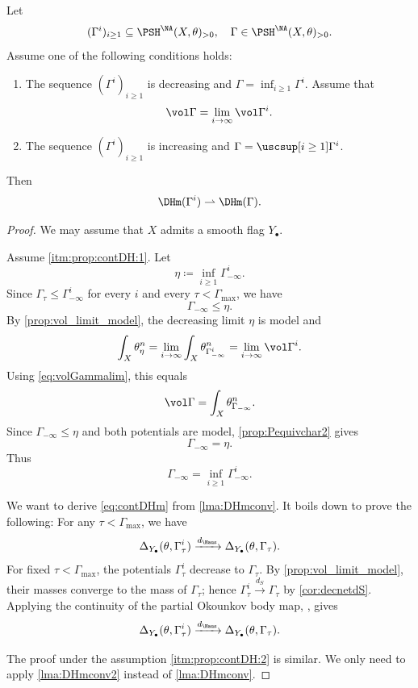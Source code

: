 \begin{proposition}\label{prop:contDH}
Let
\[
(\Gamma^i)_{i\geq 1}\subseteq \PSH^{\NA}(X,\theta)_{>0},\quad \Gamma\in \PSH^{\NA}(X,\theta)_{>0}.
\]
Assume one of the following conditions holds:
\begin{enumerate}
    \item\label{itm:prop:contDH:1} The sequence $(\Gamma^i)_{i\geq 1}$ is decreasing and $\Gamma=\inf_{i\geq 1}\Gamma^i$. Assume that
    \begin{equation}\label{eq:volGammalim}
    \vol \Gamma=\lim_{i\to\infty}\vol \Gamma^i.
    \end{equation}
    \item\label{itm:prop:contDH:2} The sequence $(\Gamma^i)_{i\geq 1}$ is increasing and $\Gamma=\uscsup[i\geq 1]\Gamma^i$.
\end{enumerate}
    Then
    \begin{equation}\label{eq:contDHm}
    \DHm(\Gamma^i)\rightharpoonup \DHm(\Gamma).
    \end{equation}
\end{proposition}
\begin{proof}
    We may assume that $X$ admits a smooth flag $Y_{\bullet}$.

    Assume \ref{itm:prop:contDH:1}. Let
\[
    \eta\coloneqq\inf_{i\geq 1}\Gamma^i_{-\infty}.
\]
Since $\Gamma_\tau\leq \Gamma^i_{-\infty}$ for every $i$ and every $\tau<\Gamma_{\max}$, we have
\[
    \Gamma_{-\infty}\leq \eta.
\]
By \cref{prop:vol_limit_model}, the decreasing limit $\eta$ is model and
\[
    \int_X\theta_\eta^n=\lim_{i\to\infty}\int_X\theta_{\Gamma^i_{-\infty}}^n=\lim_{i\to\infty}\vol\Gamma^i.
\]
Using \eqref{eq:volGammalim}, this equals
\[
    \vol\Gamma=\int_X\theta_{\Gamma_{-\infty}}^n.
\]
Since $\Gamma_{-\infty}\leq\eta$ and both potentials are model, \cref{prop:Pequivchar2} gives
\[
    \Gamma_{-\infty}=\eta.
\]
Thus
\[
    \Gamma_{-\infty}=\inf_{i\geq1}\Gamma^i_{-\infty}.
\]

We want to derive \eqref{eq:contDHm} from \cref{lma:DHmconv}.
    It boils down to prove the following: For any $\tau<\Gamma_{\max}$, we have
    \[
        \Delta_{Y_{\bullet}}(\theta,\Gamma^i_{\tau})\xrightarrow{d_{\Haus}} \Delta_{Y_{\bullet}}(\theta,\Gamma_{\tau}).
    \]
    For fixed $\tau<\Gamma_{\max}$, the potentials $\Gamma^i_\tau$ decrease to $\Gamma_\tau$. By \cref{prop:vol_limit_model}, their masses converge to the mass of $\Gamma_\tau$; hence $\Gamma^i_\tau\xrightarrow{d_S}\Gamma_\tau$ by \cref{cor:decnetdS}. Applying the continuity of the partial Okounkov body map, , gives
    \[
        \Delta_{Y_{\bullet}}(\theta,\Gamma^i_{\tau})\xrightarrow{d_{\Haus}}\Delta_{Y_{\bullet}}(\theta,\Gamma_{\tau}).
    \]

    The proof under the assumption \ref{itm:prop:contDH:2} is similar. We only need to apply \cref{lma:DHmconv2} instead of \cref{lma:DHmconv}.
\end{proof}


